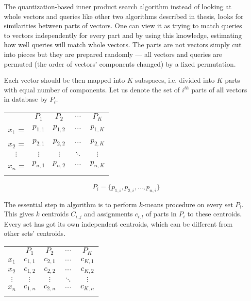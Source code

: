 The quantization-based inner product search algorithm \cite{quantization}
instead of looking at whole vectors and queries like other two algorithms described in thesis,
looks for similarities between parts of vectors.
One can view it as trying to match queries to vectors independently for every part and
by using this knowledge, estimating how well queries will match whole vectors.
The parts are not vectors simply cut into pieces but they are prepared randomly
 --- all vectors and queries are permuted (the order of vectors' components changed)
by a fixed permutation.
\par
Each vector should be then mapped into $K$ subspaces, i.e. divided into $K$ parts with equal number of components.
Let us denote the set of $i^{th}$ parts of all vectors in database by $P_i$.
\begin{center}
\renewcommand{\arraystretch}{1.2}
\begin{tabular}{c|c|c|c|c|}
\multicolumn{1}{r}{} & \multicolumn{1}{c}{$P_{1}$} & \multicolumn{1}{c}{$P_{2}$}
& \multicolumn{1}{c}{$\cdots$} & \multicolumn{1}{c}{$P_{K}$} \\
\hhline{~----}
$x_1$ = & $p_{1,1}$ & $p_{1,2}$ & $\cdots$ & $p_{1,K}$ \\
\hhline{~----}
$x_2$ = & $p_{2,1}$ & $p_{2,2}$ & $\cdots$ & $p_{2,K}$ \\
\hhline{~----}
$\vdots$ & $\vdots$ & $\vdots$ & $\ddots$ & $\vdots$ \\
\hhline{~----}
$x_n$ = & $p_{n,1}$ & $p_{n,2}$ & $\cdots$ & $p_{n,K}$ \\
\hhline{~----}
\end{tabular}
\end{center}

\begin{equation*}
P_i = \{ p_{1,i}, p_{2,i}, \ldots, p_{n,i} \}
\end{equation*}

The essential step in algorithm is to perform $k$-means procedure on every set $P_i$.
This gives $k$ centroids $C_{i,j}$ and assignments $c_{i,l}$ of parts in $P_i$ to these centroids.
Every set has got its own independent centroids, which can be different from other sets' centroids.

\begin{center}
\renewcommand{\arraystretch}{1.2}
\begin{tabular}{c|c|c|c|c|}
\multicolumn{1}{r}{} & \multicolumn{1}{c}{$P_{1}$} & \multicolumn{1}{c}{$P_{2}$}
& \multicolumn{1}{c}{$\cdots$} & \multicolumn{1}{c}{$P_{K}$} \\
\hhline{~----}
$x_1$ & $c_{1,1}$ & $c_{2,1}$ & $\cdots$ & $c_{K,1}$ \\
\hhline{~----}
$x_2$ & $c_{1,2}$ & $c_{2,2}$ & $\cdots$ & $c_{K,2}$ \\
\hhline{~----}
$\vdots$ & $\vdots$ & $\vdots$ & $\ddots$ & $\vdots$ \\
\hhline{~----}
$x_n$ & $c_{1,n}$ & $c_{2,n}$ & $\cdots$ & $c_{K,n}$ \\
\hhline{~----}
\end{tabular}
\end{center}

